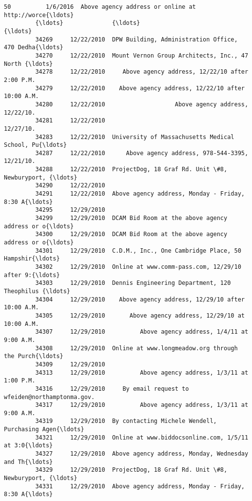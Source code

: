 \documentclass[11pt]{article}
\begin{document}
\begin{Verbatim}[commandchars=\\\{\}]
         50          1/6/2016  Above agency address or online at http://worce{\ldots}   
         {\ldots}              {\ldots}                                                {\ldots}   
         34269     12/22/2010  DPW Building, Administration Office, 470 Dedha{\ldots}   
         34270     12/22/2010  Mount Vernon Group Architects, Inc., 47 North {\ldots}   
         34278     12/22/2010     Above agency address, 12/22/10 after 2:00 P.M.   
         34279     12/22/2010    Above agency address, 12/22/10 after 10:00 A.M.   
         34280     12/22/2010                    Above agency address, 12/22/10.   
         34281     12/22/2010                                          12/27/10.   
         34283     12/22/2010  University of Massachusetts Medical School, Pu{\ldots}   
         34287     12/22/2010      Above agency address, 978-544-3395, 12/21/10.   
         34288     12/22/2010  ProjectDog, 18 Graf Rd. Unit \#8, Newburyport, {\ldots}   
         34290     12/22/2010                                                      
         34291     12/22/2010  Above agency address, Monday - Friday, 8:30 A{\ldots}   
         34295     12/29/2010                                                      
         34299     12/29/2010  DCAM Bid Room at the above agency address or o{\ldots}   
         34300     12/29/2010  DCAM Bid Room at the above agency address or o{\ldots}   
         34301     12/29/2010  C.D.M., Inc., One Cambridge Place, 50 Hampshir{\ldots}   
         34302     12/29/2010  Online at www.comm-pass.com, 12/29/10 after 9:{\ldots}   
         34303     12/29/2010  Dennis Engineering Department, 120 Theophilus {\ldots}   
         34304     12/29/2010    Above agency address, 12/29/10 after 10:00 A.M.   
         34305     12/29/2010       Above agency address, 12/29/10 at 10:00 A.M.   
         34307     12/29/2010          Above agency address, 1/4/11 at 9:00 A.M.   
         34308     12/29/2010  Online at www.longmeadow.org through the Purch{\ldots}   
         34309     12/29/2010                                                      
         34313     12/29/2010          Above agency address, 1/3/11 at 1:00 P.M.   
         34316     12/29/2010     By email request to wfeiden@northamptonma.gov.   
         34317     12/29/2010          Above agency address, 1/3/11 at 9:00 A.M.   
         34319     12/29/2010  By contacting Michele Wendell, Purchasing Agen{\ldots}   
         34321     12/29/2010  Online at www.biddocsonline.com, 1/5/11 at 3:0{\ldots}   
         34327     12/29/2010  Above agency address, Monday, Wednesday and Th{\ldots}   
         34329     12/29/2010  ProjectDog, 18 Graf Rd. Unit \#8, Newburyport, {\ldots}   
         34331     12/29/2010  Above agency address, Monday - Friday, 8:30 A{\ldots}   
         

\end{Verbatim}
\end{document}
